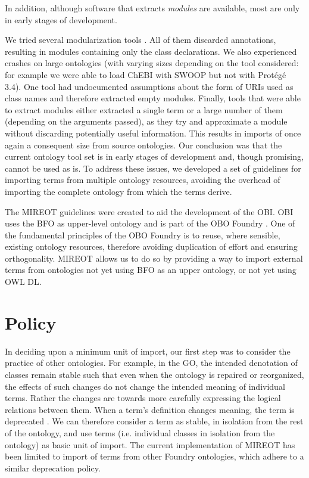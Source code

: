 \documentclass{ao2e}%
\begin{document}
In addition, although software that extracts \emph{modules} are available, most are only in early stages of development.

We tried several modularization tools \cite{Grau2} \cite{Jimenez}  \cite{Seidenberg} \cite{Sirin}. 
All of them discarded annotations, resulting in modules containing only the class declarations.
We also experienced crashes on large ontologies (with varying sizes depending on the tool considered: for example we were able to load ChEBI \cite{ChEBI} with SWOOP but not with Prot\'eg\'e 3.4).
One tool %
had undocumented assumptions about the form of URIs used as class names and therefore extracted empty modules. 
Finally, tools %
that were able to extract modules either extracted a single term or a large number of them (depending on the arguments passed), as they try and approximate a module without discarding potentially useful information. This results in imports of once again a consequent size from source ontologies.
Our conclusion was that the current ontology tool set  is in early stages of development and, though promising, cannot be used as is. 
To address these issues, we developed a set of guidelines for importing terms from multiple ontology resources, avoiding the overhead of importing the complete ontology from which the terms derive. 

The \ac{MIREOT} guidelines were created to aid the development of the \ac{OBI}.
\ac{OBI} uses the \ac{BFO} \cite{BFO} as upper-level ontology and is part of the \ac{OBO} Foundry \cite{OBOFoundry}. 
One of the fundamental principles of the \ac{OBO} Foundry is to reuse, where sensible, existing ontology resources, therefore avoiding duplication of effort and ensuring orthogonality.
\ac{MIREOT} allows us to do so by providing a way to import external terms from ontologies not yet using \ac{BFO} as an upper ontology, or not yet using OWL DL.

\section{Policy}

In deciding upon a minimum unit of import, our first step was to consider the practice of other ontologies.
For example, in the \ac{GO}, the intended denotation of classes remain stable such that even when the ontology is repaired or reorganized, the effects of such changes do not change the intended meaning of individual terms.
Rather the changes are towards more carefully expressing the logical relations between them.
When a term's definition changes meaning, the term is deprecated \cite{GOGuide}.
We can therefore consider a term as stable, in isolation from the rest of the ontology, and use terms (i.e. individual classes in isolation from the ontology) as basic unit of import.
The current implementation of \ac{MIREOT} has been limited to import of terms from other Foundry ontologies, which adhere to a similar deprecation policy.
\end{document}
